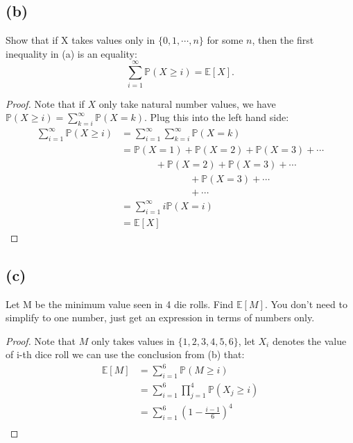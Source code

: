 \documentclass{article}
\begin{document}
\subsection*{(b)}
Show that if X takes values only in $\{0,1,\cdots,n\}$ for some $n$, then the first inequality in (a) is an equality:
\begin{equation*}
    \sum_{i=1}^{\infty} \mathbb{P}(X\geq i) = \mathbb{E}[X].
\end{equation*}
\color{blue}
\begin{proof}
    Note that if $X$ only take natural number values, we have $\mathbb{P}(X\geq i) = \sum_{k=i}^\infty\mathbb{P}(X=k)$. Plug this into the left hand side:
    \begin{equation*}
        \begin{split}
            \sum_{i=1}^{\infty} \mathbb{P}(X\geq i) &= \sum_{i=1}^{\infty} \sum_{k=i}^\infty\mathbb{P}(X=k)\\
            &=\mathbb{P}(X = 1) +\mathbb{P}(X = 2)+\mathbb{P}(X = 3)+\cdots\\
            &\ \ \ \ \ \ \ \ \ \ \ \ \ \ \ \  +\mathbb{P}(X = 2)+\mathbb{P}(X = 3)+\cdots\\
            &\ \ \ \ \ \ \ \ \ \ \ \ \ \ \ \ \ \ \ \ \ \ \ \ \ \ \ \ \ \ \ \ +\mathbb{P}(X = 3)+\cdots\\
            &\ \ \ \ \ \ \ \ \ \ \ \ \ \ \ \ \ \ \ \ \ \ \ \ \ \ \ \ \ \ \ \ +\cdots\\
            &=\sum_{i=1}^\infty i \mathbb{P}(X = i)\\
            &=\mathbb{E}[X]
        \end{split}
    \end{equation*}
\end{proof}
\color{black}
\subsection*{(c)}
Let M be the minimum value seen in 4 die rolls. Find $\mathbb{E}[M]$. You don't need to simplify to one number, just get an expression in terms of numbers only.
\color{blue}
\begin{proof}
Note that $M$ only takes values in $\{1,2,3,4,5,6\}$, let $X_i$ denotes the value of i-th dice roll we can use the conclusion from (b) that:
\begin{equation*}
    \begin{split}
        \mathbb{E}[M] &= \sum_{i=1}^6 \mathbb{P}(M\geq i)\\
        &= \sum_{i=1}^6 \prod_{j=1}^4 \mathbb{P}(X_j\geq i)\\
        &= \sum_{i=1}^6 \left(1-\frac{i-1}{6}\right)^4\\
    \end{split}
\end{equation*}
\end{proof}
\color{black}
\end{document}
